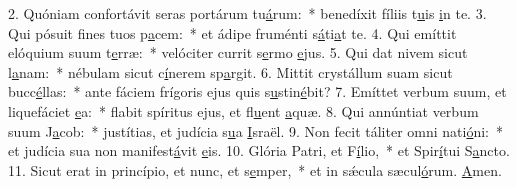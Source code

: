 2. Quóniam confortávit seras portárum tu\uline{á}rum:~* benedíxit fíliis t\uline{u}is \uline{i}n te.
3. Qui pósuit fines tuos p\uline{a}cem:~* et ádipe fruménti s\uline{á}ti\uline{a}t te.
4. Qui emíttit elóquium suum t\uline{e}rræ:~* velóciter currit s\uline{e}rmo \uline{e}jus.
5. Qui dat nivem sicut l\uline{a}nam:~* nébulam sicut c\uline{í}nerem sp\uline{a}rgit.
6. Mittit crystállum suam sicut bucc\uline{é}llas:~* ante fáciem frígoris ejus quis s\uline{u}stin\uline{é}bit?
7. Emíttet verbum suum, et liquefáciet \uline{e}a:~* flabit spíritus ejus, et fl\uline{u}ent \uline{a}quæ.
8. Qui annúntiat verbum suum J\uline{a}cob:~* justítias, et judícia s\uline{u}a \uline{I}sraël.
9. Non fecit táliter omni nati\uline{ó}ni:~* et judícia sua non manifest\uline{á}vit \uline{e}is.
10. Glória Patri, et F\uline{í}lio,~* et Spir\uline{í}tui S\uline{a}ncto.
11. Sicut erat in princípio, et nunc, et s\uline{e}mper,~* et in sǽcula sæcul\uline{ó}rum. \uline{A}men.
